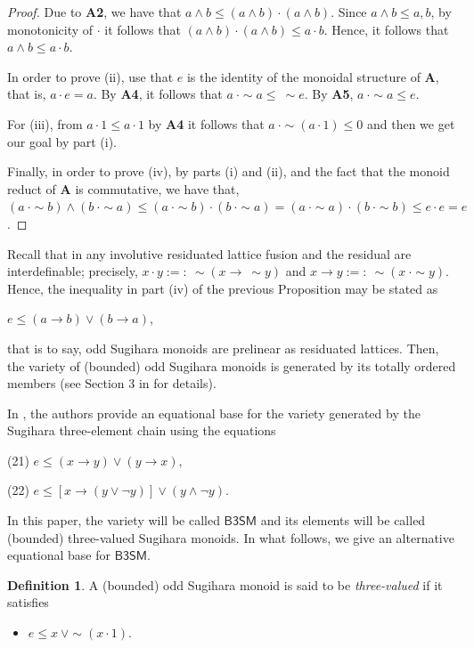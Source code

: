 \documentclass[a4paper,11pt]{article}
\theoremstyle{definition}
\newtheorem{defn}[theorem]{Definition}
\newcommand{\ra}{\rightarrow}
\newcommand{\vbtsm}{\mathsf{B3SM}}
\begin{document}
\begin{proof}
Due to \textbf{A2}, we have that $a \wedge b \leq (a \wedge b) \cdot (a \wedge b)$. 
Since $a \wedge b \leq a, b$, by monotonicity of $\cdot$ it follows that $(a \wedge b) \cdot (a \wedge b) \leq a \cdot b$. 
Hence, it follows that $a \wedge b \leq a \cdot b$.
	 
In order to prove (ii), use that $e$ is the identity of the monoidal structure of $\mathbf{A}$, that is, $a \cdot e = a$. 
By \textbf{A4}, it follows that $a\ \cdot \sim a \leq\ \sim e$. 
By \textbf{A5}, $a\ \cdot \sim a \leq e$.
	 	 
For (iii), from $a \cdot 1 \leq a \cdot 1$ by \textbf{A4} it follows that $a\ \cdot \sim(a \cdot 1) \leq 0$ and then we get our goal by part (i).

Finally, in order to prove (iv), by parts (i) and (ii), and the fact that the monoid reduct of $\mathbf{A}$ is commutative, we have that, $(a\ \cdot \sim b) \wedge (b\ \cdot \sim a) \leq (a\ \cdot \sim b) \cdot (b\ \cdot \sim a) = (a\ \cdot \sim a) \cdot (b\ \cdot \sim b) \leq e \cdot e = e$.	\end{proof}

Recall that in any involutive residuated lattice fusion and the residual are interdefinable; precisely, $x \cdot y :=:\ \sim(x \to\ \sim y)$ and $x \ra y :=:\ \sim(x\ \cdot \sim y)$. 
Hence, the inequality in part (iv) of the previous Proposition may be stated as 

$e \leq (a \to b) \vee (b \to a)$, 

\noindent that is to say, odd Sugihara monoids are prelinear as residuated lattices.
Then, the variety of (bounded) odd Sugihara monoids is generated by its totally ordered members (see Section 3 in \cite{HRT} for details).

In \cite{MRWb}, the authors provide an equational base for the variety generated by the Sugihara three-element chain using the equations 

(21) $e \leq (x \to y) \vee (y \to x)$,

(22) $e \leq [x \to (y \vee \neg y)] \vee (y \wedge \neg y)$.

\noindent In this paper, the variety will be called $\vbtsm$ and its elements will be called (bounded) three-valued Sugihara monoids.
In what follows, we give an alternative equational base for $\vbtsm$.

\begin{defn} \label{tBOSM}
A (bounded) odd Sugihara monoid is said to be \emph{three-valued} if it satisfies
\begin{itemize}
\item[\textbf{A6}] $e \leq x\ \vee \sim(x \cdot 1)$.
\end{itemize}
\end{defn}
\end{document}
